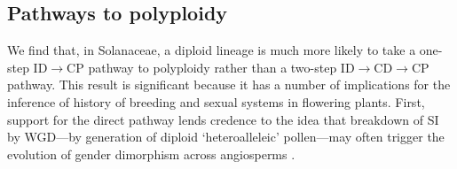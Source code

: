 
%
%

\subsection*{Pathways to polyploidy}


We find that, in Solanaceae, a diploid lineage is much more likely to take a
one-step  ID$\rightarrow$CP pathway to polyploidy rather than a two-step ID$\rightarrow$CD$\rightarrow$CP pathway.
This result is significant because it has a number of implications for the inference of history of breeding and sexual systems in flowering plants.
First, support for the direct pathway lends credence to the idea that breakdown of SI by WGD---by generation of diploid `heteroalleleic' pollen---may often trigger the evolution of gender dimorphism across angiosperms \citep{miller_2000,roberston_2011}.


